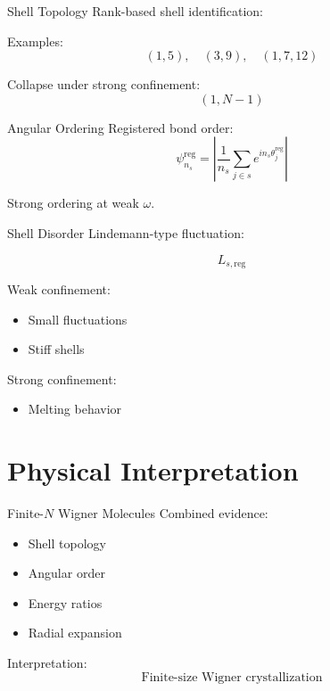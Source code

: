 \documentclass{beamer}
\begin{document}
\begin{frame}{Shell Topology}
Rank-based shell identification:

Examples:
\[
(1,5), \quad (3,9), \quad (1,7,12)
\]

Collapse under strong confinement:
\[
(1,N-1)
\]
\end{frame}

\begin{frame}{Angular Ordering}
Registered bond order:
\[
\psi^{\text{reg}}_{n_s}
=
\left|
\frac{1}{n_s}
\sum_{j\in s} e^{in_s\theta_j^{\text{reg}}}
\right|
\]

Strong ordering at weak $\omega$.
\end{frame}

\begin{frame}{Shell Disorder}
Lindemann-type fluctuation:

\[
L_{s,\text{reg}}
\]

Weak confinement:
\begin{itemize}
\item Small fluctuations
\item Stiff shells
\end{itemize}

Strong confinement:
\begin{itemize}
\item Melting behavior
\end{itemize}
\end{frame}

\section{Physical Interpretation}

\begin{frame}{Finite-$N$ Wigner Molecules}
Combined evidence:
\begin{itemize}
\item Shell topology
\item Angular order
\item Energy ratios
\item Radial expansion
\end{itemize}

Interpretation:
\[
\text{Finite-size Wigner crystallization}
\]
\end{frame}
\end{document}
